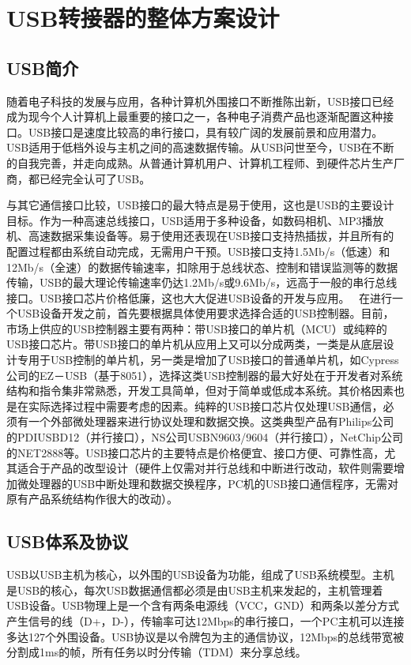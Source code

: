 
\chapter{USB转接器的整体方案设计}
\section{USB简介}
随着电子科技的发展与应用，各种计算机外围接口不断推陈出新，USB接口已经成为现今个人计算机上最重要的接口之一，各种电子消费产品也逐渐配置这种接口。USB接口是速度比较高的串行接口，具有较广阔的发展前景和应用潜力。USB适用于低档外设与主机之间的高速数据传输。从USB问世至今，USB在不断的自我完善，并走向成熟。从普通计算机用户、计算机工程师、到硬件芯片生产厂商，都已经完全认可了USB。

与其它通信接口比较，USB接口的最大特点是易于使用，这也是USB的主要设计目标。作为一种高速总线接口，USB适用于多种设备，如数码相机、MP3播放机、高速数据采集设备等。易于使用还表现在USB接口支持热插拔，并且所有的配置过程都由系统自动完成，无需用户干预。USB接口支持1.5Mb/s（低速）和12Mb/s（全速）的数据传输速率，扣除用于总线状态、控制和错误监测等的数据传输，USB的最大理论传输速率仍达1.2Mb/s或9.6Mb/s，远高于一般的串行总线接口。USB接口芯片价格低廉，这也大大促进USB设备的开发与应用。 
在进行一个USB设备开发之前，首先要根据具体使用要求选择合适的USB控制器。目前，市场上供应的USB控制器主要有两种：带USB接口的单片机（MCU）或纯粹的USB接口芯片。带USB接口的单片机从应用上又可以分成两类，一类是从底层设计专用于USB控制的单片机，另一类是增加了USB接口的普通单片机，如Cypress公司的EZ－USB（基于8051），选择这类USB控制器的最大好处在于开发者对系统结构和指令集非常熟悉，开发工具简单，但对于简单或低成本系统。其价格因素也是在实际选择过程中需要考虑的因素。纯粹的USB接口芯片仅处理USB通信，必须有一个外部微处理器来进行协议处理和数据交换。这类典型产品有Philips公司的PDIUSBD12（并行接口），NS公司USBN9603/9604（并行接口），NetChip公司的NET2888等。USB接口芯片的主要特点是价格便宜、接口方便、可靠性高，尤其适合于产品的改型设计（硬件上仅需对并行总线和中断进行改动，软件则需要增加微处理器的USB中断处理和数据交换程序，PC机的USB接口通信程序，无需对原有产品系统结构作很大的改动）。
\section{USB体系及协议}
USB以USB主机为核心，以外围的USB设备为功能，组成了USB系统模型。主机是USB的核心，每次USB数据通信都必须是由USB主机来发起的，主机管理着USB设备。USB物理上是一个含有两条电源线（VCC，GND）和两条以差分方式产生信号的线（D+，D-），传输率可达12Mbps的串行接口，一个PC主机可以连接多达127个外围设备。USB协议是以令牌包为主的通信协议，12Mbps的总线带宽被分割成1ms的帧，所有任务以时分传输（TDM）来分享总线。

